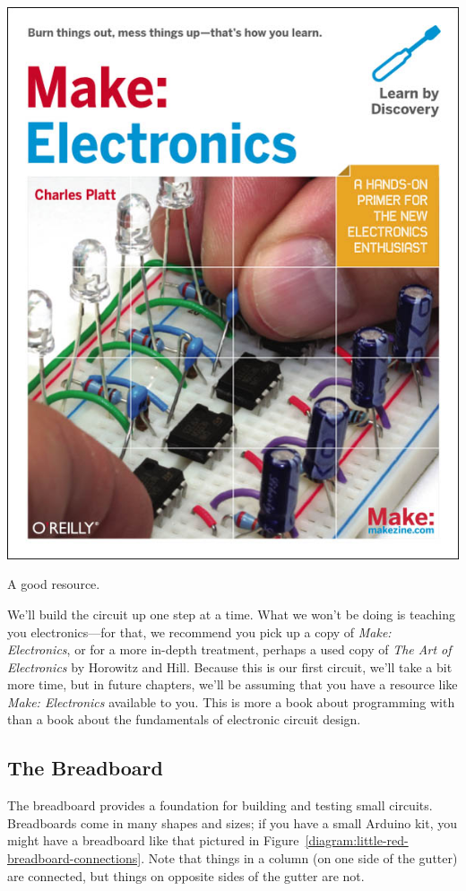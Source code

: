 \begin{floatingfigure}[r]{0.5\linewidth}
	  \begin{center}
    	\includegraphics[width=0.4\linewidth]{images/make-electronics-cover}
			\captionsetup{labelformat=empty,justification=centering,font=footnotesize}
   		\caption{A good resource.}
  \end{center}
\end{floatingfigure}

We'll build the circuit up one step at a time. What we won't be doing is teaching you electronics---for that, we recommend you pick up a copy of {\em Make: Electronics}, or for a more in-depth treatment, perhaps a used copy of {\em The Art of Electronics} by Horowitz and Hill. Because this is our first circuit, we'll take a bit more time, but in future chapters, we'll be assuming that you have a resource like {\em Make: Electronics} available to you. This is more a book about programming with \plumbing than a book about the fundamentals of electronic circuit design.

\newpage

\subsection{The Breadboard}
The breadboard provides a foundation for building and testing small circuits. Breadboards come in many shapes and sizes; if you have a small Arduino kit, you might have a breadboard like that pictured in Figure~\vref{diagram:little-red-breadboard-connections}. Note that things in a column (on one side of the gutter) are connected, but things on opposite sides of the gutter are not. 


